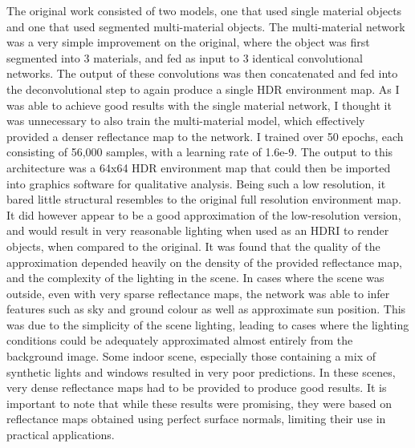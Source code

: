 \documentclass[ %
                    author={Gavin Parker},
                supervisor={Dr. Neill Campbell},
                    degree={MEng},
                     title={Deep Siamese Networks for Illumination Estimation from Stereo Images},
                  subtitle={},
                      type={research},
                      year={2018} ]{dissertation}
\begin{document}
The original work consisted of two models, one that used single material objects and one that used segmented multi-material objects. The multi-material network was a very simple improvement on the original, where the object was first segmented into 3 materials, and fed as input to 3 identical convolutional networks. The output of these convolutions was then concatenated and fed into the deconvolutional step to again produce a single HDR environment map. As I was able to achieve good results with the single material network, I thought it was unnecessary to also train the multi-material model, which effectively provided a denser reflectance map to the network. I trained over 50 epochs, each consisting of 56,000 samples, with a learning rate of 1.6e-9. The output to this architecture was a 64x64 HDR environment map that could then be imported into graphics software for qualitative analysis. Being such a low resolution, it bared little structural resembles to the original full resolution environment map. It did however appear to be a good approximation of the low-resolution version, and would result in very reasonable lighting when used as an HDRI to render objects, when compared to the original. It was found that the quality of the approximation depended heavily on the density of the provided reflectance map, and the complexity of the lighting in the scene. In cases where the scene was outside, even with very sparse reflectance maps, the network was able to infer features such as sky and ground colour as well as approximate sun position. This was due to the simplicity of the scene lighting, leading to cases where the lighting conditions could be adequately approximated almost entirely from the background image. Some indoor scene, especially those containing a mix of synthetic lights and windows resulted in very poor predictions. In these scenes, very dense reflectance maps had to be provided to produce good results. 
\newline
It is important to note that while these results were promising, they were based on reflectance maps obtained using perfect surface normals, limiting their use in practical applications. 
\end{document}
